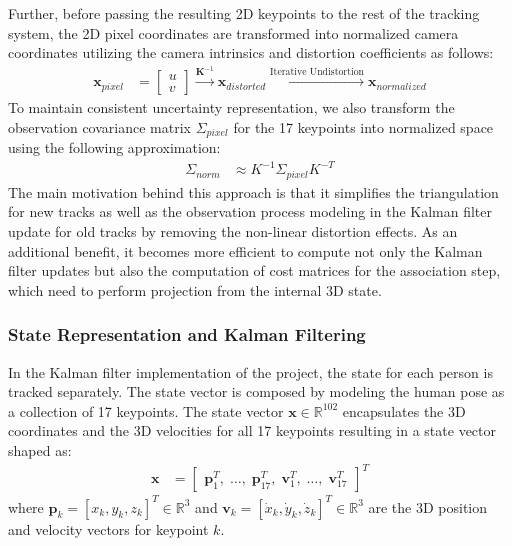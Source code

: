 Further, before passing the resulting 2D keypoints to the rest of the tracking system, the 2D pixel coordinates are transformed into normalized camera coordinates utilizing the camera intrinsics and distortion coefficients as follows:
\begin{align*}
    \mathbf{x}_{pixel} &= \begin{bmatrix} u \\ v \end{bmatrix} \xrightarrow{\mathbf{K}^{-1}} \mathbf{x}_{distorted} \xrightarrow{\text{Iterative Undistortion}} \mathbf{x}_{normalized}
\end{align*}
To maintain consistent uncertainty representation, we also transform the observation covariance matrix $\Sigma_{pixel}$ for the 17 keypoints into normalized space using the following approximation:
\begin{align*}
    \Sigma_{norm} &\approx K^{-1} \Sigma_{pixel} K^{-T}
\end{align*}
The main motivation behind this approach is that it simplifies the triangulation for new tracks as well as the observation process modeling in the Kalman filter update for old tracks by removing the non-linear distortion effects. As an additional benefit, it becomes more efficient to compute not only the Kalman filter updates but also the computation of cost matrices for the association step, which need to perform projection from the internal 3D state.


\subsubsection{State Representation and Kalman Filtering} \label{arch-filter}

In the Kalman filter implementation of the project, the state for each person is tracked separately. The state vector is composed by modeling the human pose as a collection of 17 keypoints. The state vector $\mathbf{x} \in \mathbb{R}^{102}$ encapsulates the 3D coordinates and the 3D velocities for all 17 keypoints resulting in a state vector shaped as:
\begin{align*}
    \mathbf{x} &= \begin{bmatrix} \mathbf{p}_1^T, \; \dots, \; \mathbf{p}_{17}^T, \; \mathbf{v}_1^T, \; \dots, \; \mathbf{v}_{17}^T \end{bmatrix}^T
\end{align*}
where $\mathbf{p}_k = [x_k, y_k, z_k]^T \in \mathbb{R}^3$ and $\mathbf{v}_k = [\dot{x}_k, \dot{y}_k, \dot{z}_k]^T \in \mathbb{R}^3$ are the 3D position and velocity vectors for keypoint $k$.

